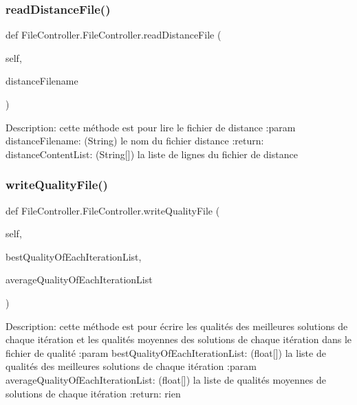 \subsubsection{\texorpdfstring{read\+Distance\+File()}{readDistanceFile()}}
{\footnotesize\ttfamily def File\+Controller.\+File\+Controller.\+read\+Distance\+File (\begin{DoxyParamCaption}\item[{}]{self,  }\item[{}]{distance\+Filename }\end{DoxyParamCaption})}

\begin{DoxyVerb}Description: cette méthode est pour lire le fichier de distance
:param distanceFilename: (String) le nom du fichier distance
:return: distanceContentList: (String[]) la liste de lignes du fichier de distance
\end{DoxyVerb}
 \mbox{\label{class_file_controller_1_1_file_controller_add13ed4f13f217efae17bd3f2e0f1563}} 
\subsubsection{\texorpdfstring{write\+Quality\+File()}{writeQualityFile()}}
{\footnotesize\ttfamily def File\+Controller.\+File\+Controller.\+write\+Quality\+File (\begin{DoxyParamCaption}\item[{}]{self,  }\item[{}]{best\+Quality\+Of\+Each\+Iteration\+List,  }\item[{}]{average\+Quality\+Of\+Each\+Iteration\+List }\end{DoxyParamCaption})}

\begin{DoxyVerb}Description: cette méthode est pour écrire les qualités des meilleures solutions de chaque itération et
        les qualités moyennes des solutions de chaque itération dans le fichier de qualité
:param bestQualityOfEachIterationList: (float[]) la liste de qualités des meilleures solutions de chaque itération
:param averageQualityOfEachIterationList: (float[]) la liste de qualités moyennes de solutions de chaque itération
:return: rien
\end{DoxyVerb}
 \mbox{\label{class_file_controller_1_1_file_controller_a5d023bfee30423bd602d153f08f89910}} 
